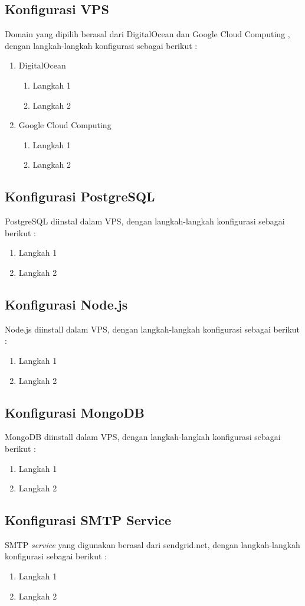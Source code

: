    \subsection{Konfigurasi VPS}
    Domain yang dipilih berasal dari DigitalOcean dan Google Cloud Computing , dengan langkah-langkah konfigurasi sebagai berikut :
    \begin{enumerate}
    \item DigitalOcean
      \begin{enumerate}
      \item Langkah 1
      \item Langkah 2
      \end{enumerate}
    \item Google Cloud Computing
      \begin{enumerate}
      \item Langkah 1
      \item Langkah 2
      \end{enumerate}
    \end{enumerate}
    
    \subsection{Konfigurasi PostgreSQL}
    PostgreSQL diinstal dalam VPS, dengan langkah-langkah konfigurasi sebagai berikut :
    \begin{enumerate}
    \item Langkah 1
    \item Langkah 2
    \end{enumerate}
    
    \subsection{Konfigurasi Node.js}
    Node.js diinstall dalam VPS, dengan langkah-langkah konfigurasi sebagai berikut :
    \begin{enumerate}
    \item Langkah 1
    \item Langkah 2
    \end{enumerate}
    
    \subsection{Konfigurasi MongoDB}
    MongoDB diinstall dalam VPS, dengan langkah-langkah konfigurasi sebagai berikut :
    \begin{enumerate}
    \item Langkah 1
    \item Langkah 2
    \end{enumerate}
    
    \subsection{Konfigurasi SMTP Service}
    SMTP \textit{service} yang digunakan berasal dari sendgrid.net, dengan langkah-langkah konfigurasi sebagai berikut :
    \begin{enumerate}
    \item Langkah 1
    \item Langkah 2
    \end{enumerate}
